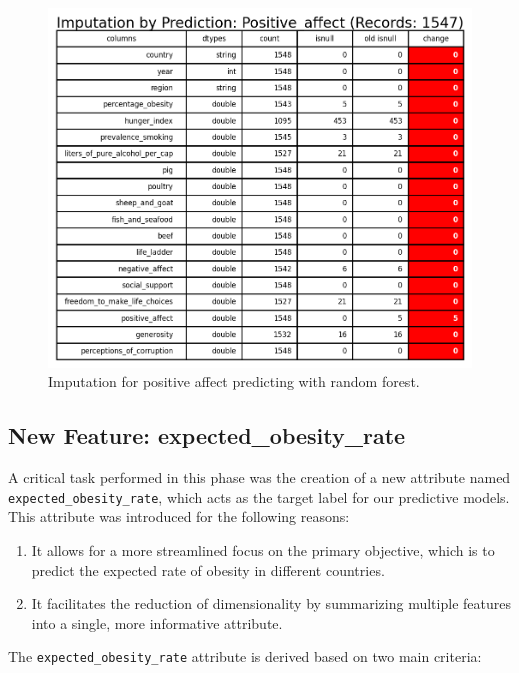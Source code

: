                 \begin{figure}[H]
                        \centering
                        \includegraphics[scale=1]{images/dp_imput_positive_affect}
                        \caption{Imputation for positive affect predicting with random forest.}
                        \label{fig:dp-imput-positive-affect}
                \end{figure}

        \subsection{New Feature: expected\_obesity\_rate}
            A critical task performed in this phase was the creation of a new attribute named \texttt{expected\_obesity\_rate}, which acts as the target label for our predictive models. This attribute was introduced for the following reasons:

            \begin{enumerate}
                \item It allows for a more streamlined focus on the primary objective, which is to predict the expected rate of obesity in different countries.
                \item It facilitates the reduction of dimensionality by summarizing multiple features into a single, more informative attribute.
            \end{enumerate}

            The \texttt{expected\_obesity\_rate} attribute is derived based on two main criteria:

